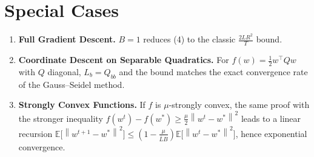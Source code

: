 \documentclass{article}
\newcommand{\E}{\mathbb{E}}
\newcommand{\norm}[1]{\left\lVert#1\right\rVert}
\begin{document}
\section*{Special Cases}
\begin{enumerate}
\item \textbf{Full Gradient Descent.} $B=1$ reduces (4) to the classic
$\frac{2L R^{2}}{T}$ bound.
\item \textbf{Coordinate Descent on Separable Quadratics.} For $f(w)=\frac12 w^{\top}Q w$ with $Q$ diagonal,
$L_{b}=Q_{bb}$ and the bound matches the exact convergence rate of the
Gauss–Seidel method.
\item \textbf{Strongly Convex Functions.} If $f$ is $\mu$‑strongly convex,
the same proof with the stronger inequality
$f(w^{t})-f(w^{*})\ge\frac{\mu}{2}\norm{w^{t}-w^{*}}^{2}$
leads to a linear recursion
$\E\!\bigl[\norm{w^{t+1}-w^{*}}^{2}\bigr]\le
\left(1-\frac{\mu}{\bar L B}\right)\E\!\bigl[\norm{w^{t}-w^{*}}^{2}\bigr]$,
hence exponential convergence.
\end{enumerate}
\end{document}
